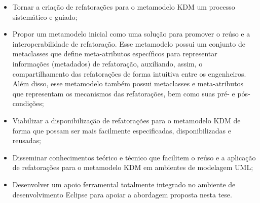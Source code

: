 \begin{itemize}

    \item Tornar a criação de refatorações para o metamodelo KDM um processo sistemático e guiado;
    
    \item Propor um metamodelo inicial como uma solução para promover o reúso e a interoperabilidade de refatoração. Esse metamodelo possui um conjunto de metaclasses que define meta-atributos específicos para representar informações (metadados) de refatoração, auxiliando, assim, o compartilhamento das refatorações de forma intuitiva entre os engenheiros. Além disso, esse metamodelo também possui metaclasses e meta-atributos que representam os mecanismos das refatorações, bem como suas pré- e pós-condições;
    
    \item Viabilizar a disponibilização de refatorações para o metamodelo KDM de forma que possam ser mais facilmente especificadas, disponibilizadas e reusadas; 
    
    \item Disseminar conhecimentos teórico e técnico que facilitem o reúso e a aplicação de refatorações para o metamodelo KDM em ambientes de modelagem UML;
    

	
	
	
	
	
    \item Desenvolver um apoio ferramental totalmente integrado no ambiente de desenvolvimento Eclipse para apoiar a abordagem proposta nesta tese.

\end{itemize}




